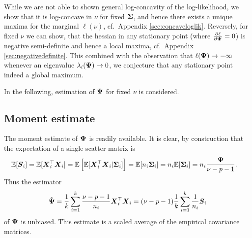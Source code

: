 \documentclass{article}\usepackage[]{graphicx}\usepackage[]{color}
\begin{document}
While we are not able to shown general log-concavity of the log-likelihood, we show that it is log-concave in $\nu$ for fixed ${\boldsymbol{\Sigma}}$, and hence there exists a unique maxima for the marginal $\ell(\nu)$, cf.\ Appendix \ref{sec:concaveloglik}.
Reversely, for fixed $\nu$ we can show, that the hessian in any stationary point (where $\frac{\partial\ell}{\partial{\boldsymbol{\Psi}}} = 0$) is negative semi-definite and hence a local maxima, cf.\ Appendix \ref{sec:negativedefinite}. This combined with the observation that $\ell({\boldsymbol{\Psi}}) \to -\infty$ whenever an eigenvalue $\lambda_i({\boldsymbol{\Psi}}) \to 0$, we conjecture that any stationary point indeed a global maximum.

In the following, estimation of ${\boldsymbol{\Psi}}$ for fixed $\nu$ is considered.

\subsection{Moment estimate}
The moment estimate of ${\boldsymbol{\Psi}}$ is readily available. It is clear, by construction that the expectation of a single scatter matrix is
\begin{align*}
  &\mathbb{E}[ \boldsymbol{S}_i ]
    = \mathbb{E}[{\boldsymbol{X}}_i^\top{\boldsymbol{X}}_i ]
    = \mathbb{E}\left[\mathbb{E}[{\boldsymbol{X}}_i^\top{\boldsymbol{X}}_i | {\boldsymbol{\Sigma}}_i ]\right]
    = \mathbb{E}[n_i {\boldsymbol{\Sigma}}_i]
    = n_i\mathbb{E}[{\boldsymbol{\Sigma}}_i]
    = n_i\frac{{\boldsymbol{\Psi}}}{\nu - p - 1}.
\end{align*}
Thus the estimator
\begin{align}
  \hat{{\boldsymbol{\Psi}}}
  = \frac{1}{k} \sum_{i = 1}^k \frac{\nu - p - 1}{n_i}{\boldsymbol{X}}_i^\top{\boldsymbol{X}}_i
  = (\nu - p - 1) \frac{1}{k} \sum_{i = 1}^k \frac{1}{n_i}{\boldsymbol{S}}_i
  \label{eq:moment}
\end{align}
of ${\boldsymbol{\Psi}}$ is unbiased. This estimate is a scaled average of the empirical covariance matrices.
\end{document}

